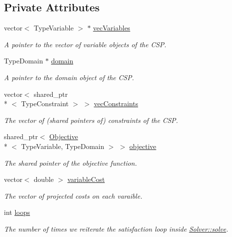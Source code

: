 \subsection*{Private Attributes}
\begin{DoxyCompactItemize}
\item 
vector$<$ Type\-Variable $>$ $\ast$ \hyperlink{classghost_1_1Solver_a2d033a454234b2277aabdcc4d89eaba2}{vec\-Variables}
\begin{DoxyCompactList}\small\item\em A pointer to the vector of variable objects of the C\-S\-P. \end{DoxyCompactList}\item 
Type\-Domain $\ast$ \hyperlink{classghost_1_1Solver_ad9292e9219261ba8058fec05b453c0c9}{domain}
\begin{DoxyCompactList}\small\item\em A pointer to the domain object of the C\-S\-P. \end{DoxyCompactList}\item 
vector$<$ shared\-\_\-ptr\\*
$<$ Type\-Constraint $>$ $>$ \hyperlink{classghost_1_1Solver_a170746edcfb777b12978444c2ab3962e}{vec\-Constraints}
\begin{DoxyCompactList}\small\item\em The vector of (shared pointers of) constraints of the C\-S\-P. \end{DoxyCompactList}\item 
shared\-\_\-ptr$<$ \hyperlink{classghost_1_1Objective}{Objective}\\*
$<$ Type\-Variable, Type\-Domain $>$ $>$ \hyperlink{classghost_1_1Solver_a4fd74bd68d0ea253fd35adad697f964d}{objective}
\begin{DoxyCompactList}\small\item\em The shared pointer of the objective function. \end{DoxyCompactList}\item 
vector$<$ double $>$ \hyperlink{classghost_1_1Solver_a76c1057367112ead0304b436b5f508f1}{variable\-Cost}
\begin{DoxyCompactList}\small\item\em The vector of projected costs on each varaible. \end{DoxyCompactList}\item 
int \hyperlink{classghost_1_1Solver_aa6a77e14862a9be467e6c6c76124b526}{loops}
\begin{DoxyCompactList}\small\item\em The number of times we reiterate the satisfaction loop inside \hyperlink{classghost_1_1Solver_a30dd2769fb30ac42d231d2c305dcdf13}{Solver\-::solve}. \end{DoxyCompactList}\item 

\end{DoxyCompactItemize}
